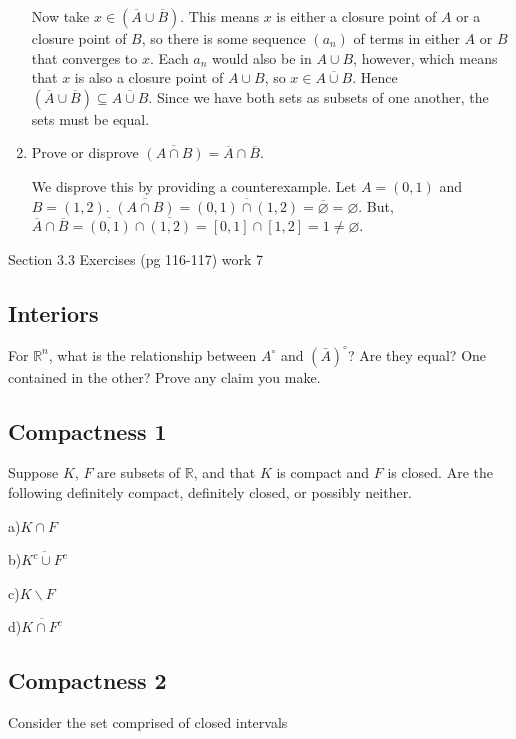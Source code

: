 \documentclass[11pt]{article}
\newcommand{\R}{\mathbb{R}}
\begin{document}
\begin{enumerate}
Now take $x\in(\overline{A}\cup\overline{B})$. This means $x$ is either
a closure point of $A$ or a closure point of $B$, so there is some sequence
$(a_n)$ of terms in either $A$ or $B$ that converges to $x$. Each $a_n$ would
also be in $A\cup B$, however, which means that $x$ is also a closure point 
of $A\cup B$, so $x\in\overline{A\cup B}$.
Hence $(\overline{A}\cup\overline{B})\subseteq\overline{A\cup B}$.
Since we have both sets as subsets of one another, the sets must be equal.

\item{Prove or disprove $\overline{(A\cap B)}=\overline{A}\cap\overline{B}$.}

We disprove this by providing a counterexample.
Let $A=(0,1)$ and $B=(1,2)$. $\overline{(A\cap B)} = \overline{(0,1)\cap(1,2)}
= \overline{\varnothing} = \varnothing$.
But, $\overline{A}\cap\overline{B} = \overline{(0,1)}\cap\overline{(1,2)}
= [0,1]\cap[1,2] = {1} \neq \varnothing$.

\end{enumerate}

Section 3.3 Exercises (pg 116-117) work 7

\subsection*{Interiors}

For $\R^n$, what is the relationship between $A^\circ$ and $({\bar A})^\circ$? Are they equal? One contained in the other? Prove any claim you make. 

\subsection*{Compactness 1}

Suppose $K$, $F$ are subsets of $\R$, and that $K$ is compact and $F$ is closed. Are the following definitely compact, definitely closed, or possibly neither.

a)\quad $K\cap F$

b)\quad $\overline{K^c \cup F^c}$   

c)\quad $K\backslash F$

d)\quad $\overline{K \cap F^c}$


\subsection*{Compactness 2}

Consider the set comprised of closed intervals
\end{document}
